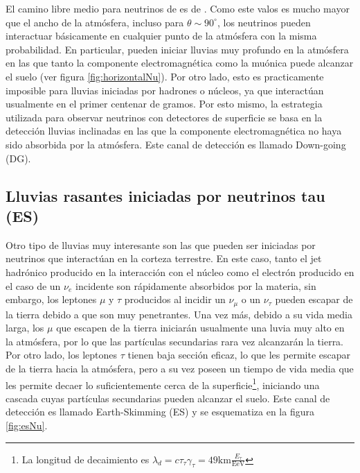 El camino libre medio para neutrinos de  es de \cite{cite:Gandhi}. 
Como este valos es mucho mayor que el ancho de la atmósfera, incluso para $\theta\sim90^\circ$, los neutrinos pueden interactuar básicamente en cualquier punto de la atmósfera con la misma probabilidad.
En particular, pueden iniciar lluvias muy profundo en la atmósfera en las que tanto la componente electromagnética como la muónica puede alcanzar el suelo (ver figura \ref{fig:horizontalNu}).
Por otro lado, esto es practicamente imposible para lluvias iniciadas por hadrones o núcleos, ya que interactúan usualmente en el primer centenar de gramos.
Por esto mismo, la estrategia utilizada para observar neutrinos con detectores de superficie se basa en la detección lluvias inclinadas en las que la componente electromagnética no haya sido absorbida por la atmósfera. Este canal de detección es llamado Down-going (DG).

%
\subsection{Lluvias rasantes iniciadas por neutrinos tau (ES)}
\label{sc:EStauInducedShowers}
%
Otro tipo de lluvias muy interesante son las que pueden ser iniciadas por neutrinos que interactúan en la corteza terrestre.
En este caso, tanto el jet hadrónico producido en la interacción con el núcleo como el electrón producido en el caso de un $\nu_e$ incidente son rápidamente absorbidos por la materia, sin embargo, los leptones $\mu$ y $\tau$ producidos al incidir un $\nu_{\mu}$ o un $\nu_{\tau}$ pueden escapar de la tierra debido a que son muy penetrantes.
Una vez más, debido a su vida media larga, los $\mu$ que escapen de la tierra iniciarán usualmente una luvia muy alto en la atmósfera, por lo que las partículas secundarias rara vez alcanzarán la tierra.
Por otro lado, los leptones $\tau$ tienen baja sección eficaz, lo que les permite escapar de la tierra hacia la atmósfera, pero a su vez poseen un tiempo de vida media que les permite decaer lo suficientemente cerca de la superficie\footnote{La longitud de decaimiento es $\lambda_{d}=c\tau_{\tau}\gamma_{\tau}=49\text{km}\frac{E_{\tau}}{\text{EeV}}$}, iniciando una cascada cuyas partículas secundarias pueden alcanzar el suelo. Este canal de detección es llamado Earth-Skimming (ES) y se esquematiza en la figura \ref{fig:esNu}.

